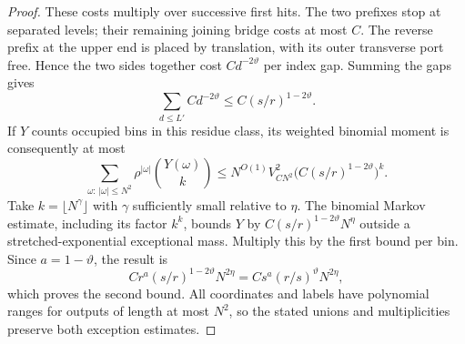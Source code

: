 \begin{proof}
These costs multiply over successive first hits. The two prefixes
stop at separated levels; their remaining joining bridge costs at
most $C$. The reverse prefix at the upper end is placed by translation,
with its outer transverse port free. Hence the two sides together
cost $Cd^{-2\vartheta}$ per index gap. Summing the gaps gives
\[
 \sum_{d\le L'}Cd^{-2\vartheta}\le C(s/r)^{1-2\vartheta}.
\]
If $Y$ counts occupied bins in this residue class, its weighted
binomial moment is consequently at most
\[
 \sum_{\omega:\,|\omega|\le N^2}\rho^{|\omega|}\binom{Y(\omega)}k
 \le N^{O(1)}V_{CN^2}^2
        \bigl(C(s/r)^{1-2\vartheta}\bigr)^k.
\]
Take $k=\lfloor N^\gamma\rfloor$ with $\gamma$ sufficiently small
relative to $\eta$. The binomial Markov estimate, including its factor
$k^k$, bounds $Y$ by $C(s/r)^{1-2\vartheta}N^\eta$ outside a
stretched-exponential exceptional mass. Multiply this by the first
bound per bin. Since $a=1-\vartheta$, the result is
\[
 Cr^a(s/r)^{1-2\vartheta}N^{2\eta}
       =Cs^a(r/s)^\vartheta N^{2\eta},
\]
which proves the second bound. All coordinates and labels have
polynomial ranges for outputs of length at most $N^2$, so the stated
unions and multiplicities preserve both exception estimates.
\end{proof}

